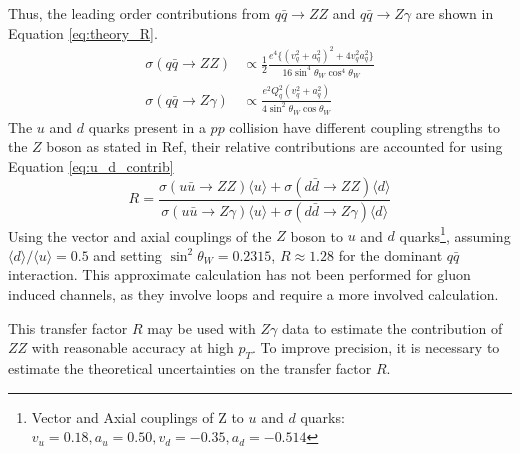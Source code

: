\documentclass[11pt,a4paper,openright,twoside]{report}
\begin{document}
Thus, the leading order contributions from $q\bar{q}\rightarrow ZZ$ and $q\bar{q}\rightarrow Z\gamma$ are shown in Equation \ref{eq:theory_R}.
\begin{equation}
\begin{split}
	\sigma(q\bar{q}\rightarrow ZZ) &\propto \frac{1}{2}\frac{e^4\{(v_q^2 + a_q^2)^2 + 4v_q^2a_q^2\} }{16\sin^4\theta_W\cos^4\theta_W}\\[1.5ex]
	\sigma(q\bar{q}\rightarrow Z\gamma) &\propto \frac{e^2Q_q^2(v^2_q + a^2_q)}{4\sin^2\theta_W\cos\theta_W}
\end{split}
\label{eq:theory_R}
\end{equation}
The $u$ and $d$ quarks present in a $pp$ collision have different coupling strengths to the $Z$ boson as stated in Ref\cite{Z_coupling}, their relative contributions are accounted for using Equation \ref{eq:u_d_contrib}
\begin{equation}
R = \frac{\sigma(u\bar{u}\rightarrow ZZ)\langle u\rangle + \sigma(d\bar{d}\rightarrow ZZ)\langle d\rangle}{\sigma(u\bar{u}\rightarrow Z\gamma)\langle u\rangle + \sigma(d\bar{d}\rightarrow Z\gamma)\langle d\rangle}
\label{eq:u_d_contrib}
\end{equation}
Using the vector and axial couplings of the $Z$ boson to $u$ and $d$ quarks\footnote{Vector and Axial couplings of Z to $u$ and $d$ quarks: $v_u = 0.18, a_u = 0.50, v_d = -0.35, a_d = -0.514$}, assuming $\langle d \rangle/\langle u\rangle = 0.5$ and setting $\sin^2\theta_W = 0.2315$, $R\approx 1.28$ for the dominant $q\bar{q}$ interaction. This approximate calculation has not been performed for gluon induced channels, as they involve loops and require a more involved calculation.

This transfer factor $R$ may be used with $Z\gamma$ data to estimate the contribution of $ZZ$ with reasonable accuracy at high $p_T$. To improve precision, it is necessary to estimate the theoretical uncertainties on the transfer factor $R$.
\end{document}
